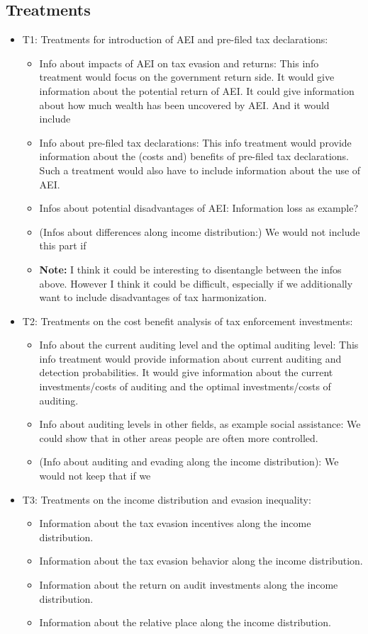\documentclass[a4paper, 12pt]{article}
\begin{document}
\subsection{Treatments}
\begin{itemize}
    \item T1: Treatments for introduction of  AEI and pre-filed tax declarations:
    \begin{itemize}
        \item Info about impacts of AEI on tax evasion and returns: This info treatment would focus on the government return side. It would give information about the potential return of AEI. It could give information about how much wealth has been uncovered by AEI. And it would include   
        \item Info about pre-filed tax declarations: This info treatment would provide information about the (costs and) benefits of pre-filed tax declarations. Such a treatment would also have to include information about the use of AEI.
        \item Infos about potential disadvantages of AEI: Information loss as example?
        \item (Infos about differences along income distribution:) We would not include this part if 
        \item \textbf{Note:} I think it could be interesting to disentangle between the infos above. However I think it could be difficult, especially if we additionally want to include disadvantages of tax harmonization.   
    \end{itemize}
    \item T2: Treatments on the cost benefit analysis of tax enforcement investments:
    \begin{itemize}
        \item Info about the current auditing level and the optimal auditing level: This info treatment would provide information about current auditing and detection probabilities. It would give information about the current investments/costs of auditing and the optimal investments/costs of auditing.  
        \item Info about auditing levels in other fields, as example social assistance: We could show that in other areas people are often more controlled.  
        \item (Info about auditing and evading along the income distribution): We would not keep that if we  
    \end{itemize}
    \item T3: Treatments on the income distribution and evasion inequality: 
    \begin{itemize}
        \item Information about the tax evasion incentives along the income distribution.
        \item Information about the tax evasion behavior along the income distribution.
        \item Information about the return on audit investments along the income distribution.
        \item Information about the relative place along the income distribution.
    \end{itemize}
\end{itemize}
\end{document}
